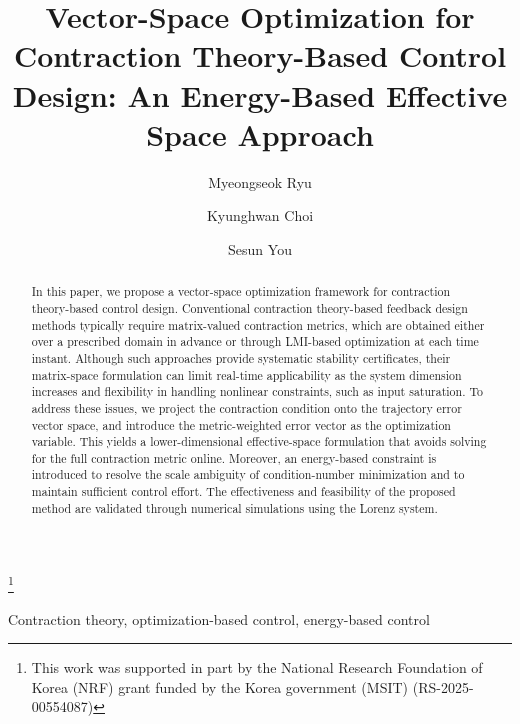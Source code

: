 \documentclass{ifacconf}
\begin{document}
\begin{frontmatter}

\title{
   Vector-Space Optimization for Contraction Theory-Based Control Design: An Energy-Based Effective Space Approach
} 

\thanks[footnoteinfo]{
   This work was supported in part by the National Research Foundation of Korea (NRF) grant funded by the Korea government (MSIT) (RS-2025-00554087)
}

\author[First]{Myeongseok Ryu} 
\author[First]{Kyunghwan Choi} 
\author[Second]{Sesun You}

\address[First]{
   Korea Advanced Institute of Science and Technology (KAIST), 
   Daejeon 34051, South Korea (e-mail: \{dding\_98, kh.choi\}@kaist.ac.kr)}
\address[Second]{
   Incheon National University, 
   Incheon 22012, South Korea (e-mail: yousesun@inu.ac.kr)}

\begin{abstract}                %
   In this paper, we propose a vector-space optimization framework for contraction theory-based control design.
   Conventional contraction theory-based feedback design methods typically require matrix-valued contraction metrics, which are obtained either over a prescribed domain in advance or through LMI-based optimization at each time instant.
   Although such approaches provide systematic stability certificates, their matrix-space formulation can limit real-time applicability as the system dimension increases and flexibility in handling nonlinear constraints, such as input saturation.
   To address these issues, we project the contraction condition onto the trajectory error vector space, and introduce the metric-weighted error vector as the optimization variable.
   This yields a lower-dimensional effective-space formulation that avoids solving for the full contraction metric online.
   Moreover, an energy-based constraint is introduced to resolve the scale ambiguity of condition-number minimization and to maintain sufficient control effort.
   The effectiveness and feasibility of the proposed method are validated through numerical simulations using the Lorenz system.
\end{abstract}

\begin{keyword}
   Contraction theory, 
   optimization-based control,
   energy-based control
\end{keyword}


\end{frontmatter}
\end{document}
